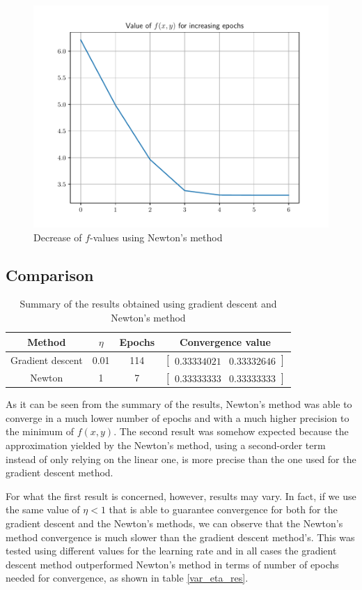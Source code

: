 \documentclass[letterpaper,headings=standardclasses]{scrartcl}
\begin{document}
\begin{figure}[H]
\centering
\includegraphics[width=.7\linewidth]{nm_fval.pdf}
\caption{Decrease of $f$-values using Newton's method}
\label{nm_fval}
\end{figure}

\subsection{Comparison}

\begin{table}[h]
\centering
\begin{tabular}{|c|c|c|c|}
\hline
Method           & $\eta$ & Epochs & Convergence value \\ \hline
Gradient descent & 0.01   & 114    & $[\begin{matrix} 0.33334021 & 0.33332646 \end{matrix}]$ \\ \hline
Newton           & 1      & 7      & $[\begin{matrix} 0.33333333 & 0.33333333 \end{matrix}]$ \\ \hline
\end{tabular}
\caption{Summary of the results obtained using gradient descent and Newton's method}
\label{summ_res}
\end{table}

As it can be seen from the summary of the results, Newton's method was able to converge in a much lower number of epochs and with a much higher precision to the minimum of $f(x,y)$. The second result was somehow expected because the approximation yielded by the Newton's method, using a second-order term instead of only relying on the linear one, is more precise than the one used for the gradient descent method.

For what the first result is concerned, however, results may vary. In fact, if we use the same value of $\eta < 1$ that is able to guarantee convergence for both for the gradient descent and the Newton's methods, we can observe that the Newton's method convergence is much slower than the gradient descent method's. This was tested using different values for the learning rate and in all cases the gradient descent method outperformed Newton's method in terms of number of epochs needed for convergence, as shown in table \ref{var_eta_res}.
\end{document}
